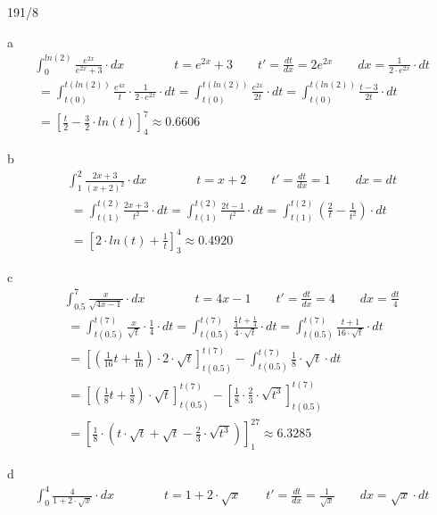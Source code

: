 \begin{exercise}{191/8}
  \item [a]
  \begin{gather*}
    \int_0^{ln(2)} \frac{e^{2x}}{e^{2x} + 3} \cdot dx \qquad\qquad t = e^{2x} + 3 \qquad t' = \frac{dt}{dx} = 2e^{2x} \qquad dx = \frac{1}{2 \cdot e^{2x}} \cdot dt \\
    \;= \int_{t(0)}^{t(ln(2))} \frac{e^{4x}}{t} \cdot \frac{1}{2 \cdot e^{2x}} \cdot dt = \int_{t(0)}^{t(ln(2))} \frac{e^{2x}}{2t} \cdot dt = \int_{t(0)}^{t(ln(2))} \frac{t - 3}{2t} \cdot dt \\
    \;= \left[\frac{t}{2} - \frac{3}{2} \cdot ln(t)\right]_4^7 \approx 0.6606
  \end{gather*}
  \item [b]
  \begin{gather*}
    \int_1^2 \frac{2x + 3}{(x + 2)^2} \cdot dx \qquad\qquad t = x + 2 \qquad t' = \frac{dt}{dx} = 1 \qquad dx = dt \\
    \;= \int_{t(1)}^{t(2)} \frac{2x + 3}{t^2} \cdot dt = \int_{t(1)}^{t(2)} \frac{2t - 1}{t^2} \cdot dt = \int_{t(1)}^{t(2)} (\frac{2}{t} - \frac{1}{t^2}) \cdot dt \\
    \;= \left[2 \cdot ln(t) + \frac{1}{t}\right]_3^4 \approx 0.4920
  \end{gather*}
  \item [c]
  \begin{gather*}
    \int_{0.5}^7 \frac{x}{\sqrt{4x - 1}} \cdot dx \qquad\qquad t = 4x - 1 \qquad t' = \frac{dt}{dx} = 4 \qquad dx = \frac{dt}{4} \\
    \;= \int_{t(0.5)}^{t(7)} \frac{x}{\sqrt{t}} \cdot \frac{1}{4} \cdot dt = \int_{t(0.5)}^{t(7)} \frac{\frac{1}{4}t + \frac{1}{4}}{4 \cdot \sqrt{t}} \cdot dt = \int_{t(0.5)}^{t(7)} \frac{t + 1}{16 \cdot \sqrt{t}} \cdot dt \\
    \;= \left[(\frac{1}{16}t + \frac{1}{16}) \cdot 2 \cdot \sqrt{t}\right]_{t(0.5)}^{t(7)} - \int_{t(0.5)}^{t(7)} \frac{1}{8} \cdot \sqrt{t} \cdot dt \\
    \;= \left[(\frac{1}{8}t + \frac{1}{8}) \cdot \sqrt{t}\right]_{t(0.5)}^{t(7)} - \left[\frac{1}{8} \cdot \frac{2}{3} \cdot \sqrt{t^3}\right]_{t(0.5)}^{t(7)} \\
    \;= \left[\frac{1}{8} \cdot (t \cdot \sqrt{t} + \sqrt{t} - \frac{2}{3} \cdot \sqrt{t^3})\right]_1^{27} \approx 6.3285
  \end{gather*}
  \item [d]
  \begin{gather*}
    \int_0^4 \frac{4}{1 + 2 \cdot \sqrt{x}} \cdot dx \qquad\qquad t = 1 + 2 \cdot \sqrt{x} \qquad t' = \frac{dt}{dx} = \frac{1}{\sqrt{x}} \qquad dx = \sqrt{x} \cdot dt \\

\end{gather*}
\end{exercise}
